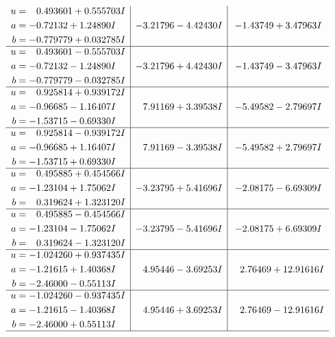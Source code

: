\documentclass[1p]{elsarticle_modified}
\theoremstyle{definition}
\begin{document}
$$\begin{array}{c|c|c}
\begin{aligned}
u &= \phantom{-}0.493601 + 0.555703 I \\
a &= -0.72132 + 1.24890 I \\
b &= -0.779779 + 0.032785 I\end{aligned}
 & -3.21796 - 4.42430 I & -1.43749 + 3.47963 I \\ \hline\begin{aligned}
u &= \phantom{-}0.493601 - 0.555703 I \\
a &= -0.72132 - 1.24890 I \\
b &= -0.779779 - 0.032785 I\end{aligned}
 & -3.21796 + 4.42430 I & -1.43749 - 3.47963 I \\ \hline\begin{aligned}
u &= \phantom{-}0.925814 + 0.939172 I \\
a &= -0.96685 - 1.16407 I \\
b &= -1.53715 - 0.69330 I\end{aligned}
 & \phantom{-}7.91169 + 3.39538 I & -5.49582 - 2.79697 I \\ \hline\begin{aligned}
u &= \phantom{-}0.925814 - 0.939172 I \\
a &= -0.96685 + 1.16407 I \\
b &= -1.53715 + 0.69330 I\end{aligned}
 & \phantom{-}7.91169 - 3.39538 I & -5.49582 + 2.79697 I \\ \hline\begin{aligned}
u &= \phantom{-}0.495885 + 0.454566 I \\
a &= -1.23104 + 1.75062 I \\
b &= \phantom{-}0.319624 + 1.323120 I\end{aligned}
 & -3.23795 + 5.41696 I & -2.08175 - 6.69309 I \\ \hline\begin{aligned}
u &= \phantom{-}0.495885 - 0.454566 I \\
a &= -1.23104 - 1.75062 I \\
b &= \phantom{-}0.319624 - 1.323120 I\end{aligned}
 & -3.23795 - 5.41696 I & -2.08175 + 6.69309 I \\ \hline\begin{aligned}
u &= -1.024260 + 0.937435 I \\
a &= -1.21615 + 1.40368 I \\
b &= -2.46000 - 0.55113 I\end{aligned}
 & \phantom{-}4.95446 - 3.69253 I & \phantom{-}2.76469 + 12.91616 I \\ \hline\begin{aligned}
u &= -1.024260 - 0.937435 I \\
a &= -1.21615 - 1.40368 I \\
b &= -2.46000 + 0.55113 I\end{aligned}
 & \phantom{-}4.95446 + 3.69253 I & \phantom{-}2.76469 - 12.91616 I\\
 \hline 
 \end{array}$$\newpage
\end{document}
